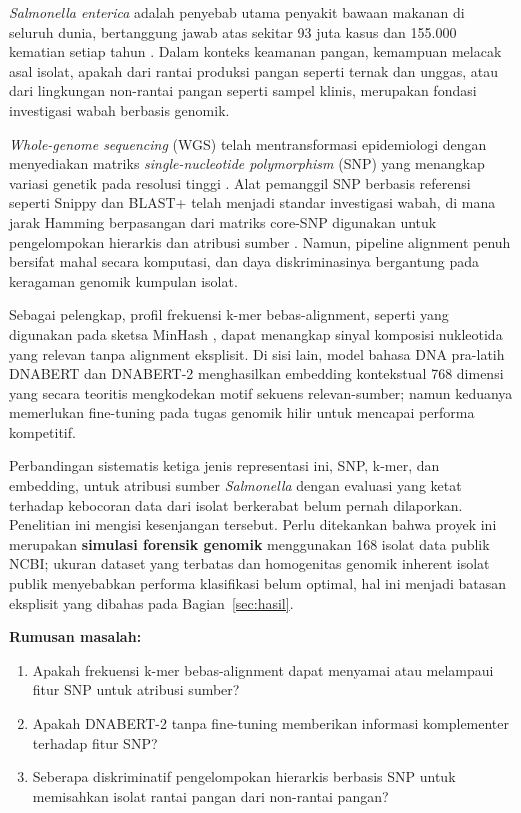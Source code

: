 \documentclass{article}
\begin{document}
\textit{Salmonella enterica} adalah penyebab utama penyakit bawaan makanan
di seluruh dunia, bertanggung jawab atas sekitar 93 juta kasus dan 155.000
kematian setiap tahun \cite{who2023salmonella}. Dalam konteks keamanan pangan,
kemampuan melacak asal isolat, apakah dari rantai produksi pangan seperti
ternak dan unggas, atau dari lingkungan non-rantai pangan seperti sampel
klinis, merupakan fondasi investigasi wabah berbasis genomik.

\textit{Whole-genome sequencing} (WGS) telah mentransformasi epidemiologi
dengan menyediakan matriks \textit{single-nucleotide polymorphism} (SNP) yang
menangkap variasi genetik pada resolusi tinggi \cite{loman2015rapid}. Alat
pemanggil SNP berbasis referensi seperti Snippy \cite{illingworth2021snippy}
dan BLAST+ \cite{camacho2009blast} telah menjadi standar investigasi wabah,
di mana jarak Hamming berpasangan dari matriks core-SNP digunakan untuk
pengelompokan hierarkis dan atribusi sumber \cite{achtman2012mlst,nguyen2020source}.
Namun, pipeline alignment penuh bersifat mahal secara komputasi, dan daya
diskriminasinya bergantung pada keragaman genomik kumpulan isolat.

Sebagai pelengkap, profil frekuensi k-mer bebas-alignment, seperti yang
digunakan pada sketsa MinHash \cite{ondov2016mash}, dapat menangkap sinyal
komposisi nukleotida yang relevan tanpa alignment eksplisit. Di sisi lain,
model bahasa DNA pra-latih DNABERT \cite{ji2021dnabert} dan DNABERT-2
\cite{zhou2023dnabert2} menghasilkan embedding kontekstual 768 dimensi yang
secara teoritis mengkodekan motif sekuens relevan-sumber; namun keduanya
memerlukan fine-tuning pada tugas genomik hilir untuk mencapai performa
kompetitif.

Perbandingan sistematis ketiga jenis representasi ini, SNP, k-mer, dan
embedding, untuk atribusi sumber \textit{Salmonella} dengan evaluasi yang
ketat terhadap kebocoran data dari isolat berkerabat belum pernah dilaporkan.
Penelitian ini mengisi kesenjangan tersebut. Perlu ditekankan bahwa proyek
ini merupakan \textbf{simulasi forensik genomik} menggunakan 168 isolat data
publik NCBI; ukuran dataset yang terbatas dan homogenitas genomik inherent
isolat publik menyebabkan performa klasifikasi belum optimal, hal ini menjadi
batasan eksplisit yang dibahas pada Bagian~\ref{sec:hasil}.

\textbf{Rumusan masalah:}
\begin{enumerate}
  \item Apakah frekuensi k-mer bebas-alignment dapat menyamai atau melampaui
        fitur SNP untuk atribusi sumber?
  \item Apakah DNABERT-2 tanpa fine-tuning memberikan informasi komplementer
        terhadap fitur SNP?
  \item Seberapa diskriminatif pengelompokan hierarkis berbasis SNP untuk
        memisahkan isolat rantai pangan dari non-rantai pangan?
\end{enumerate}
\end{document}
